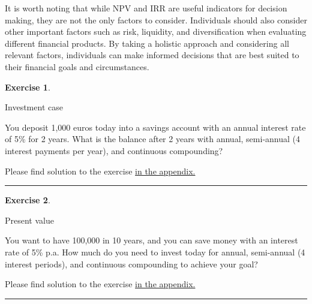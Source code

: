 \documentclass[
  12pt,
  oneside]{book}
\theoremstyle{definition}
\theoremstyle{definition}
\theoremstyle{definition}
\newtheorem{exercise}{Exercise}[chapter]
\theoremstyle{definition}
\theoremstyle{remark}
\begin{document}
It is worth noting that while NPV and IRR are useful indicators for decision making, they are not the only factors to consider. Individuals should also consider other important factors such as risk, liquidity, and diversification when evaluating different financial products. By taking a holistic approach and considering all relevant factors, individuals can make informed decisions that are best suited to their financial goals and circumstances.

\begin{exercise}
\protect\hypertarget{exr:invcase}{}\label{exr:invcase}

Investment case

You deposit 1,000 euros today into a savings account with an annual interest rate of 5\% for 2 years. What is the balance after 2 years with annual, semi-annual (4 interest payments per year), and continuous compounding?

Please find solution to the exercise \protect\hyperlink{sol:invcase}{in the appendix.}

\begin{center}\rule{0.5\linewidth}{0.5pt}\end{center}

\end{exercise}

\begin{exercise}
\protect\hypertarget{exr:presentvalueC}{}\label{exr:presentvalueC}

Present value

You want to have 100,000 in 10 years, and you can save money with an interest rate of 5\% p.a. How much do you need to invest today for annual, semi-annual (4 interest periods), and continuous compounding to achieve your goal?

Please find solution to the exercise \protect\hyperlink{sol:presentvalueC}{in the appendix.}

\begin{center}\rule{0.5\linewidth}{0.5pt}\end{center}

\end{exercise}
\end{document}
